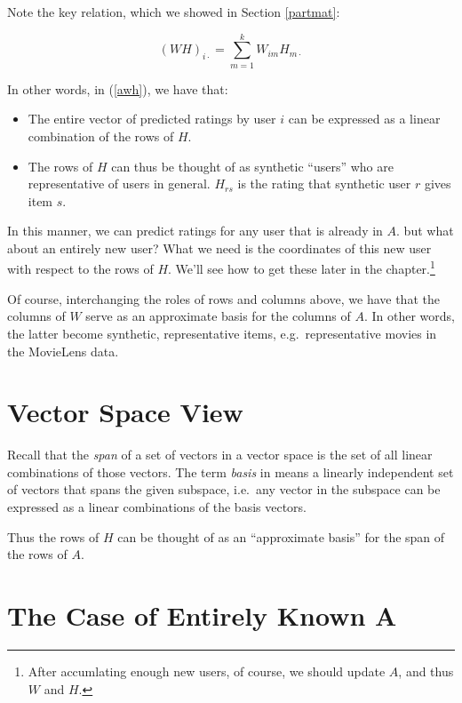 Note the key relation, which we showed in Section \ref{partmat}:

\begin{equation}
(WH)_{i \cdot} = \sum_{m=1}^k W_{im} H_{m \cdot}
\end{equation}

In other words, in (\ref{awh}), we have that:

\begin{itemize}

\item The entire vector of predicted ratings by user $i$ can be
expressed as a linear combination of the rows of $H$.


\item The rows of $H$ can thus be thought of as synthetic
``users'' who are representative of users in general.  $H_{rs}$ is the
rating that synthetic user $r$ gives item $s$.

\end{itemize} 

In this manner, we can predict ratings for any user that is already in
$A$.  but what about an entirely new user?  What we need is the
coordinates of this new user with respect to the rows of $H$.  We'll see
how to get these later in the chapter.\footnote{After accumlating enough
new users, of course, we should update $A$, and thus $W$ and $H$.}

Of course, interchanging the roles of rows and columns above, we have
that the columns of $W$ serve as an approximate basis for the columns of
$A$.  In other words, the latter become synthetic, representative items,
e.g.\ representative movies in the MovieLens data.

\section{Vector Space View}

Recall that the \textit{span} of a set of vectors in a vector space is
the set of all linear combinations of those vectors.  The term
\textit{basis} in means a linearly independent set of vectors that spans
the given subspace, i.e.\ any vector in the subspace can be expressed as
a linear combinations of the basis vectors.

Thus the rows of $H$ can be thought of as an ``approximate
basis'' for the span of the rows of $A$.

\section{The Case of Entirely Known A}

